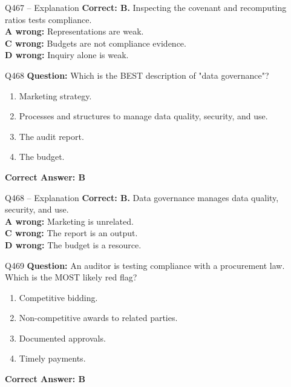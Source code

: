 \documentclass[aspectratio=169,10pt]{beamer}
\begin{document}
	\begin{frame}[t]{Q467 -- Explanation}
		\small
		\textbf{Correct: B.} Inspecting the covenant and recomputing ratios tests compliance. \\[4pt]
		\textbf{A wrong:} Representations are weak. \\[2pt]
		\textbf{C wrong:} Budgets are not compliance evidence. \\[2pt]
		\textbf{D wrong:} Inquiry alone is weak.
	\end{frame}
	
	\begin{frame}[t]{Q468}
		\small
		\textbf{Question:} Which is the BEST description of "data governance"?
		\begin{enumerate}[label=\Alph*.,itemsep=1pt,topsep=2pt]
			\item Marketing strategy.
			\item Processes and structures to manage data quality, security, and use.
			\item The audit report.
			\item The budget.
		\end{enumerate}
		\vspace{4pt}
		\textbf{Correct Answer: B}
	\end{frame}
	
	\begin{frame}[t]{Q468 -- Explanation}
		\small
		\textbf{Correct: B.} Data governance manages data quality, security, and use. \\[4pt]
		\textbf{A wrong:} Marketing is unrelated. \\[2pt]
		\textbf{C wrong:} The report is an output. \\[2pt]
		\textbf{D wrong:} The budget is a resource.
	\end{frame}
	
	\begin{frame}[t]{Q469}
		\small
		\textbf{Question:} An auditor is testing compliance with a procurement law. Which is the MOST likely red flag?
		\begin{enumerate}[label=\Alph*.,itemsep=1pt,topsep=2pt]
			\item Competitive bidding.
			\item Non-competitive awards to related parties.
			\item Documented approvals.
			\item Timely payments.
		\end{enumerate}
		\vspace{4pt}
		\textbf{Correct Answer: B}
	\end{frame}
	
\end{document}
